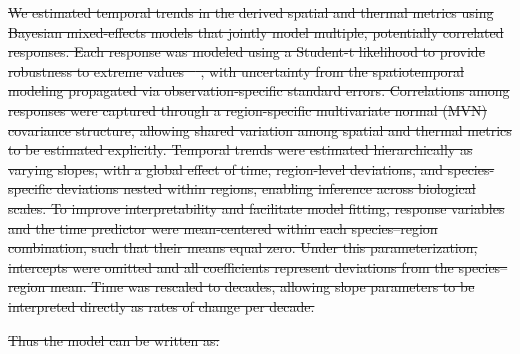 \documentclass[9pt,twocolumn,twoside]{pnas-new}
\providecommand{\DIFdel}[1]{{\protect\color{red}\sout{#1}}} %
\begin{document}
{%
\DIFdel{We estimated temporal trends in the derived spatial and thermal metrics using Bayesian mixed-effects models that jointly model multiple, potentially correlated responses. Each response was modeled using a Student-t likelihood to provide robustness to extreme values \mbox{%
\citep[e.g.,][]{anderson_black-swan_2017}}\hskip0pt%
, with uncertainty from the spatiotemporal modeling propagated via observation-specific standard errors. Correlations among responses were captured through a region-specific multivariate normal (MVN) covariance structure, allowing shared variation among spatial and thermal metrics to be estimated explicitly. Temporal trends were estimated hierarchically as varying slopes, with a global effect of time, region-level deviations, and species-specific deviations nested within regions, enabling inference across biological scales. To improve interpretability and facilitate model fitting, response variables and the time predictor were mean-centered within each species–region combination, such that their means equal zero. Under this parameterization, intercepts were omitted and all coefficients represent deviations from the species–region mean. Time was rescaled to decades, allowing slope parameters to be interpreted directly as rates of change per decade.
}%

\DIFdel{Thus the model can be written as:
}%

}
\end{document}
